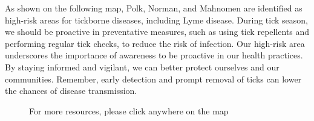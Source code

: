 \documentclass[
  a4paper,
  landscape]{scrreprt}
\begin{document}
As shown on the following map, Polk, Norman, and Mahnomen are identified
as high-risk areas for tickborne diseases, including Lyme disease.
During tick season, we should be proactive in preventative measures,
such as using tick repellents and performing regular tick checks, to
reduce the risk of infection. Our high-risk area underscores the
importance of awareness to be proactive in our health practices. By
staying informed and vigilant, we can better protect ourselves and our
communities. Remember, early detection and prompt removal of ticks can
lower the chances of disease transmission.

\begin{figure}[H]


\caption{\label{fig-tickborneRisk}For more resources, please click
anywhere on the map}

\end{figure}%
\end{document}
